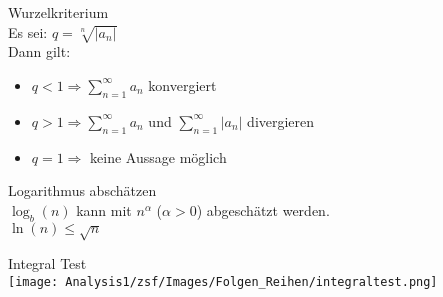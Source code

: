 \begin{concept} {Wurzelkriterium}\\
    Es sei: $q = \sqrt[n]{|a_n|}$\\
    Dann gilt:
    \begin{itemize}
        \item $q < 1 \Rightarrow \sum_{n=1}^\infty a_n$ konvergiert 
        \item $q > 1 \Rightarrow \sum_{n=1}^\infty a_n$ und $\sum_{n=1}^\infty |a_n|$ divergieren
        \item $q = 1 \Rightarrow$ keine Aussage möglich
    \end{itemize}
\end{concept}
\begin{KR}{Logarithmus abschätzen}\\
    $\log_b (n)$ kann mit $n^\alpha$ ($\alpha > 0$) abgeschätzt werden.\\
    $\ln(n) \leq \sqrt{n}$
\end{KR} 
\begin{KR}{Integral Test}\\
    \texttt{[image: Analysis1/zsf/Images/Folgen\_Reihen/integraltest.png]}
\end{KR}